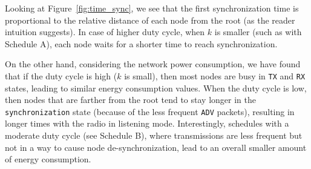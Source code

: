 Looking at Figure~\ref{fig:time_sync}, we see that the first synchronization time is proportional to the relative distance of each node from the root (as the reader intuition suggests). In case of higher duty cycle, when $k$ is smaller (such as with Schedule A), each node waits for a shorter time to reach synchronization. 

On the other hand, considering the network power consumption, we have found that if the duty cycle is high ($k$ is small), then most nodes are busy in \texttt{TX} and \texttt{RX} states, leading to similar energy consumption values. When the duty cycle is low, then nodes that are farther from the root tend to stay longer in the \texttt{synchronization} state (because of the less frequent \texttt{ADV} packets), resulting in longer times with the radio in listening mode. Interestingly, schedules with a moderate duty cycle (see Schedule B), where transmissions are less frequent but not in a way to cause node de-synchronization, lead to an overall smaller amount of energy consumption.


